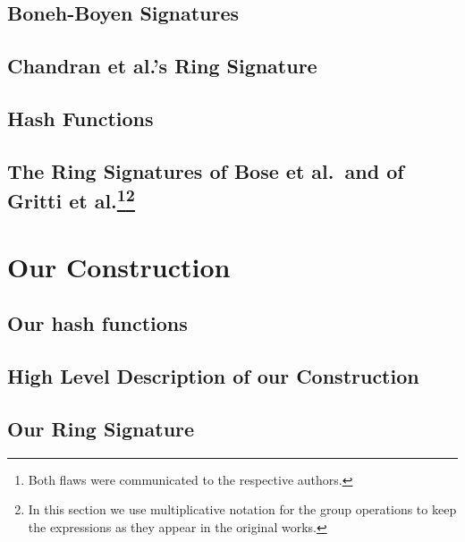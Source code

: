\documentclass{llncs}
\begin{document}
	\subsection{Boneh-Boyen Signatures} \label{sec:bbs}
    
            

      	\subsection{Chandran et al.'s Ring Signature}
	
       		

	\subsection{Hash Functions} \label{sec:hash}

		

	\subsection{The Ring Signatures of Bose et al.~and of Gritti et al.\protect\footnote{Both flaws were communicated to the respective authors.}\protect\footnote{In this section we use multiplicative notation for the group operations to keep the expressions as they appear in the original works.}}\label{sec:rs-flawed}
    
        	 

    \section{Our Construction} \label{sec:oc}

	\subsection{Our hash functions}

		

	
	
	\subsection{High Level Description of our Construction} \label{sec:high-level}
        
        		
    	
	\subsection{Our Ring Signature}\label{sec:our-construction}
        	 
	
\end{document}

